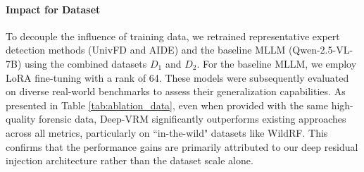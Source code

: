 \documentclass{article}
\theoremstyle{plain}
\theoremstyle{definition}
\theoremstyle{remark}
\begin{document}
\begin{table}[t]
  \centering
  \caption{Ablation study on the residual fusion coefficients $\alpha$ and $\beta$ in Eq.~\ref{eq:injection}.}
  \label{tab:ablation_coeff}
\end{table}


\paragraph{Impact for Dataset}
To decouple the influence of training data, we retrained representative expert detection methods (UnivFD and AIDE) and the baseline MLLM (Qwen-2.5-VL-7B) using the combined datasets $D_1$ and $D_2$. For the baseline MLLM, we employ LoRA fine-tuning with a rank of 64.
These models were subsequently evaluated on diverse real-world benchmarks to assess their generalization capabilities. As presented in Table \ref{tab:ablation_data}, even when provided with the same high-quality forensic data, Deep-VRM significantly outperforms existing approaches across all metrics, particularly on ``in-the-wild" datasets like WildRF. This confirms that the performance gains are primarily attributed to our deep residual injection architecture rather than the dataset scale alone. 
\begin{table}[t]
  \centering
  \caption{Performance comparison of expert detection methods, the baseline MLLM, and ours when trained on the combined $D_1$ and $D_2$ datasets.}
  \label{tab:ablation_data}
\end{table}
\end{document}
